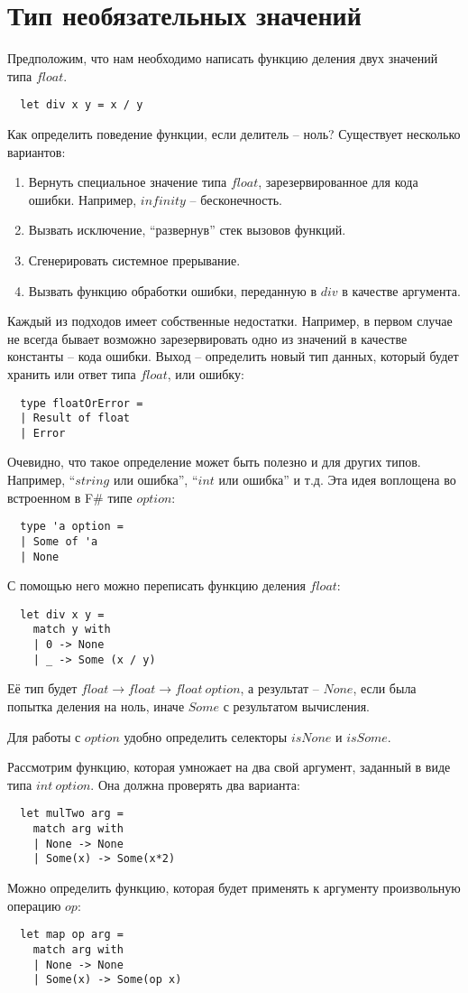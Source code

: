 \documentclass[a4paper,11pt]{article}
\begin{document}
\section{Тип необязательных значений}
Предположим, что нам необходимо написать функцию деления двух значений типа
$float$. 
\begin{lstlisting}
  let div x y = x / y
\end{lstlisting}
Как определить поведение функции, если делитель -- ноль? Существует
несколько вариантов:
\begin{enumerate}
\item Вернуть специальное значение типа $float$, зарезервированное для кода
  ошибки. Например, $infinity$ -- бесконечность.
\item Вызвать исключение, ``развернув'' стек вызовов функций.
\item Сгенерировать системное прерывание.
\item Вызвать функцию обработки ошибки, переданную в $div$ в качестве аргумента.
\end{enumerate}

Каждый из подходов имеет собственные недостатки. Например, в первом случае
не всегда бывает возможно зарезервировать одно из значений в качестве
константы -- кода ошибки. Выход -- определить новый тип данных, который будет
хранить или ответ типа $float$, или ошибку:
\begin{lstlisting}
  type floatOrError =
  | Result of float
  | Error
\end{lstlisting}
Очевидно, что такое определение может быть полезно и для других типов. Например,
``$string$ или ошибка'', ``$int$ или ошибка'' и т.д. Эта идея воплощена во
встроенном в F\# типе $option$:
\begin{lstlisting}
  type 'a option =
  | Some of 'a
  | None
\end{lstlisting}
С помощью него можно переписать функцию деления $float$:
\begin{lstlisting}
  let div x y =
    match y with 
    | 0 -> None
    | _ -> Some (x / y)
\end{lstlisting}
Её тип будет $float \rightarrow float \rightarrow float~option$, а результат --
$None$, если была попытка деления на ноль, иначе $Some$ с результатом вычисления.

Для работы с $option$ удобно определить селекторы $isNone$ и $isSome$.

Рассмотрим функцию, которая умножает на два свой аргумент, заданный в виде типа
$int~option$. Она должна проверять два варианта:
\begin{lstlisting}
  let mulTwo arg =
    match arg with
    | None -> None
    | Some(x) -> Some(x*2)
\end{lstlisting}
Можно определить функцию, которая будет применять к аргументу произвольную 
операцию $op$:
\begin{lstlisting}
  let map op arg =
    match arg with
    | None -> None
    | Some(x) -> Some(op x)
\end{lstlisting}
\end{document}
